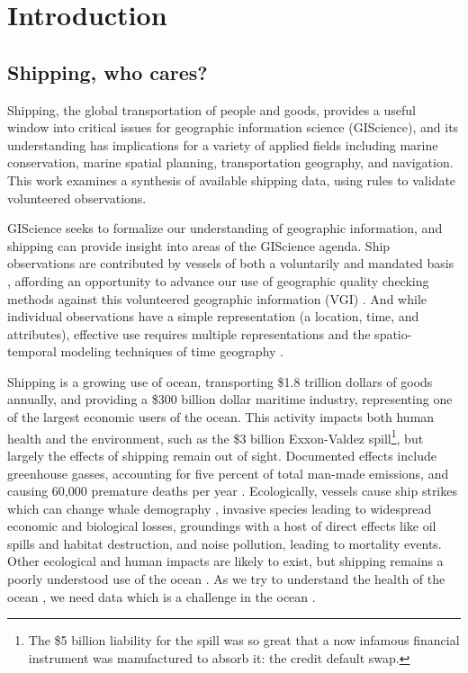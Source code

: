 \section{Introduction}


\subsection{Shipping, who cares?}

Shipping, the global transportation of people and goods, provides a useful window into critical issues for geographic information science (GIScience), and its understanding has implications for a variety of applied fields including marine conservation, marine spatial planning, transportation geography, and navigation.  This work examines a synthesis of available shipping data, using rules to validate volunteered observations.

GIScience seeks to formalize our understanding of geographic information, and shipping can provide insight into areas of the GIScience agenda. Ship observations are contributed by vessels of both a voluntarily and mandated basis \citep{VOSClim,Tetreault2002}, affording an opportunity to advance our use of geographic quality checking methods \citep{goodchildli2012} against this volunteered geographic information (VGI) \citep{goodchild2007citizens}. And while individual observations have a simple representation (a location, time, and attributes), effective use requires multiple representations \citep{Goodchild1992} and the spatio-temporal modeling techniques of time geography \citep{miller2008field}.

Shipping is a growing use of ocean, transporting \$1.8 trillion dollars of goods annually, %
and providing a \$300 billion dollar maritime industry, representing one of the largest economic users of the ocean. This activity impacts both human health and the environment, such as the \$3 billion Exxon-Valdez spill\footnote{The \$5 billion liability for the spill was so great that a now infamous financial instrument was manufactured to absorb it: the credit default swap.}, but largely the effects of shipping remain out of sight. Documented effects include greenhouse gasses, accounting for five percent of total man-made emissions, and causing 60,000 premature deaths per year \cite{Corbett2007}. Ecologically, vessels cause ship strikes which can change whale demography \citep{Fujiwara2001}, %
 invasive species leading to widespread economic and biological losses, groundings with a host of direct effects like oil spills and habitat destruction, and noise pollution, leading to mortality events. Other ecological and human impacts are likely to exist, but shipping remains a poorly understood use of the ocean \citep{Davenport2006}. As we try to understand the health of the ocean \citep{Hapern2012}, we need data %
 which is a challenge in the ocean \cite{Wright1997}.

